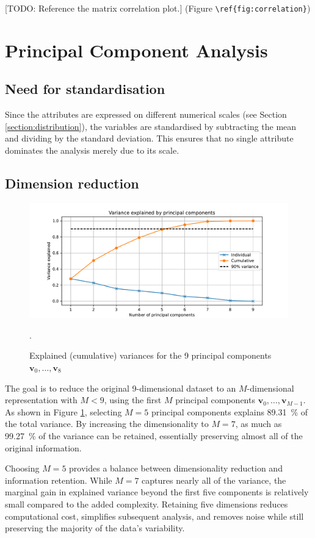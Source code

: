 \documentclass[dtu]{dtuarticle}
\newcommand{\todo}[1]{\color{red}[TODO: #1]\color{black}}
\begin{document}
	\todo{Reference the matrix correlation plot.}  (Figure \verb*|\ref{fig:correlation}|)

	\section{Principal Component Analysis}

	\subsection{Need for standardisation}

	Since the attributes are expressed on different numerical scales (see Section \ref{section:distribution}), the variables are standardised by subtracting the mean and dividing by the standard deviation. This ensures that no single attribute dominates the analysis merely due to its scale.

	\subsection{Dimension reduction}

	\begin{figure}[h!]
		\includegraphics[width=.9\textwidth]{figures/pca_explained_variance}
		\caption{Explained (cumulative) variances for the 9 principal components $\bm{v}_0,\ldots,\bm{v}_8$}.
		\label{fig:explained-var}
	\end{figure}

	The goal is to reduce the original 9-dimensional dataset to an $M$-dimensional representation with $M < 9$, using the first $M$ principal components $\bm{v}_0,\ldots,\bm{v}_{M-1}$. As shown in Figure \ref{fig:explained-var}, selecting $M=5$ principal components explains \SI{89.31}{\percent} of the total variance. By increasing the dimensionality to $M=7$, as much as \SI{99.27}{\percent} of the variance can be retained, essentially preserving almost all of the original information.

	Choosing $M=5$ provides a balance between dimensionality reduction and information retention. While $M=7$ captures nearly all of the variance, the marginal gain in explained variance beyond the first five components is relatively small compared to the added complexity. Retaining five dimensions reduces computational cost, simplifies subsequent analysis, and removes noise while still preserving the majority of the data's variability.
\end{document}
